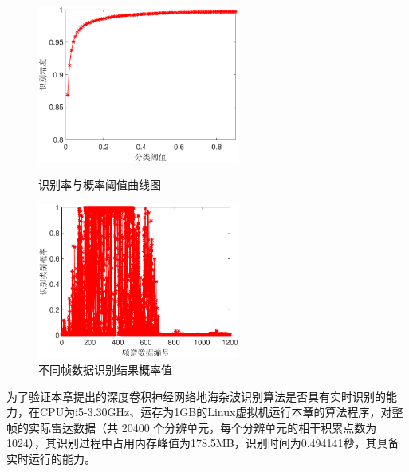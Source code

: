\begin{figure}[hbt]
	\centering
	\begin{minipage}{7cm}
		\centering
		\includegraphics[width=6.67cm]{figures/othr/threashold}
		\caption{识别率与概率阈值曲线图}
		\label{fig:threshold}
	\end{minipage}
	\hspace{10pt}
	\begin{minipage}{7cm}
		\centering
		\includegraphics[width=6.67cm]{figures/othr/prob}
		\caption{不同帧数据识别结果概率值}
		\label{fig:prob}
	\end{minipage}

\end{figure}

为了验证本章提出的深度卷积神经网络地海杂波识别算法是否具有实时识别的能力，在CPU为i5-3.30GHz、运存为1GB的Linux虚拟机运行本章的算法程序，对整帧的实际雷达数据（共 20400 个分辨单元，每个分辨单元的相干积累点数为1024），其识别过程中占用内存峰值为178.5MB，识别时间为0.494141秒，其具备实时运行的能力。


